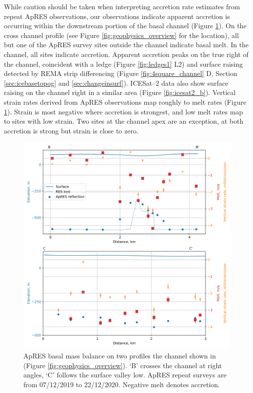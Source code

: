 While caution should be taken when interpreting accretion rate estimates from repeat ApRES observations, our observations indicate apparent accretion is occurring within the downstream portion of the basal channel (Figure \ref{fig:APRES_melt}). 
On the cross channel profile (see Figure \ref{fig:geophysics_overview} for the location), all but one of the ApRES survey sites outside the channel indicate basal melt. In the channel, all sites indicate accretion. Apparent accretion peaks on the true right of the channel, coincident with a ledge (Figure \ref{fig:ledges1} L2) and surface raising detected by REMA strip differencing (Figure \ref{fig:4square_channel} D, Section \ref{sec:icebasetopog} and \ref{sec:changeinsurf}). ICESat--2 data also show surface raising on the channel right in a similar area (Figure \ref{fig:icesat2_b}). 
Vertical strain rates derived from ApRES observations map roughly to melt rates (Figure \ref{fig:APRES_melt}). Strain is most negative where accretion is strongest, and low melt rates map to sites with low strain. Two sites at the channel apex are an exception, at both accretion is strong but strain is close to zero.

\begin{figure}[!ht]
\centering
\includegraphics[width=1\textwidth]{chapters/2/APRES_melt.png}
\caption[ApRES results]{ApRES basal mass balance on two profiles the channel shown in (Figure \ref{fig:geophysics_overview}). `B' crosses the channel at right angles, `C' follows the surface valley low.  ApRES repeat surveys are from 07/12/2019 to 22/12/2020. Negative melt denotes accretion.   }
\label{fig:APRES_melt}
\end{figure}  


